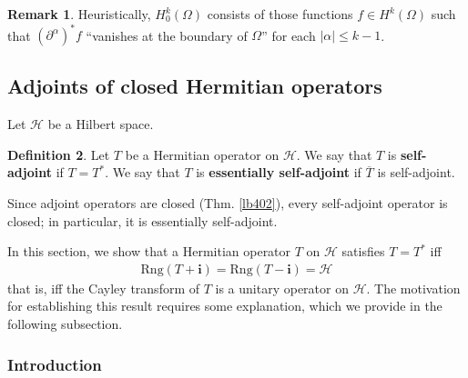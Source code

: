 \documentclass[12pt,b5paper,notitlepage]{article}
\theoremstyle{definition}
\newtheorem{df}{Definition}[subsection]
\newtheorem{rem}[df]{Remark}
\theoremstyle{plain}
\newcommand{\ovl}{\overline}
\newcommand{\im}{\mathbf{i}}
\newcommand{\Rng}{\mathrm{Rng}}
\newcommand{\MH}{\mathcal H}
\numberwithin{equation}{section}
\begin{document}
\begin{rem}\label{lb464}
Heuristically, $H^k_0(\Omega)$ consists of those functions $f\in H^k(\Omega)$ such that $(\partial^\alpha)^*f$ ``vanishes at the boundary of $\Omega$'' for each $|\alpha|\leq k-1$. 
\end{rem}



\subsection{Adjoints of closed Hermitian operators}\label{lb408}


Let $\MH$ be a Hilbert space. 
\begin{df}
Let $T$ be a Hermitian operator on $\MH$. We say that $T$ is \textbf{self-adjoint} if $T=T^*$.  We say that $T$ is \textbf{essentially self-adjoint}  if $\ovl T$ is self-adjoint.
\end{df}

Since adjoint operators are closed (Thm. \ref{lb402}), every self-adjoint operator is closed; in particular, it is essentially self-adjoint.

In this section, we show that a Hermitian operator $T$ on $\MH$ satisfies $T=T^*$ iff \begin{align}\label{eq209}
\Rng(T+\im)=\Rng(T-\im)=\MH
\end{align}
that is, iff the Cayley transform of $T$ is a unitary operator on $\MH$. The motivation for establishing this result requires some explanation, which we provide in the following subsection.




\subsubsection{Introduction}\label{lb411}

\end{document}
